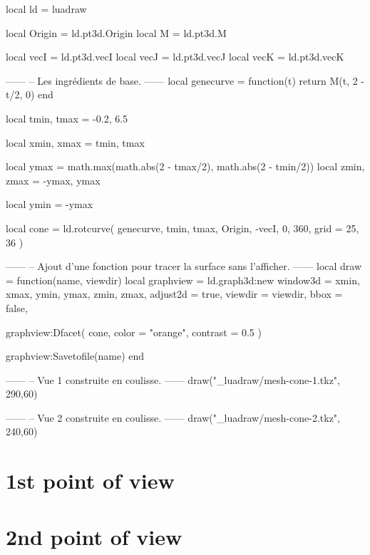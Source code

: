 \documentclass[varwidth, border = 3pt]{standalone}
\begin{document}
\begin{luadraw*}{}
local ld = luadraw

local Origin = ld.pt3d.Origin
local M      = ld.pt3d.M

local vecI = ld.pt3d.vecI
local vecJ = ld.pt3d.vecJ
local vecK = ld.pt3d.vecK

------
-- Les ingrédients de base.
------
local genecurve = function(t)
  return M(t, 2 - t/2, 0)
end

local tmin, tmax = -0.2, 6.5

local xmin, xmax = tmin, tmax

local ymax = math.max(math.abs(2 - tmax/2), math.abs(2 - tmin/2))
local zmin, zmax = -ymax, ymax

local ymin = -ymax

local cone = ld.rotcurve(
  genecurve, tmin, tmax,
  {Origin, -vecI},
  0, 360,
  {
    grid = {25, 36}
  }
)

------
-- Ajout d'une fonction pour tracer la surface sans l'afficher.
------
local draw = function(name, viewdir)
    local graphview = ld.graph3d:new{
      window3d = {xmin, xmax, ymin, ymax, zmin, zmax},
      adjust2d = true,
      viewdir  = viewdir,
      bbox     = false,
    }

    graphview:Dfacet(
        cone,
        {
          color  = "orange",
          contrast = 0.5
        }
    )

    graphview:Savetofile(name)
end

------
-- Vue 1 construite en coulisse.
------
draw("_luadraw/mesh-cone-1.tkz", {290,60})

------
-- Vue 2 construite en coulisse.
------
draw("_luadraw/mesh-cone-2.tkz", {240,60})
\end{luadraw*}


\section*{1st point of view}




\section*{2nd point of view}


\end{document}
